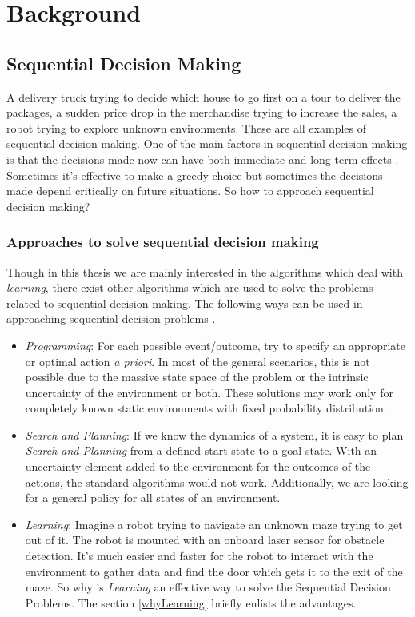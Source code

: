 \documentclass[12pt]{report}
\begin{document}
\chapter{Background} %

\label{background} %

\section{Sequential Decision Making}
\label{sequential_decision_making}
A delivery truck trying to decide which house to go first on a tour to deliver the packages, a sudden price drop in the merchandise trying to increase the sales, a robot trying to explore unknown environments. These are all examples of sequential decision making. One of the main factors in sequential decision making is that the decisions made now can have both immediate and long term effects \cite{littman1996algorithms}. Sometimes it's effective to make a greedy choice but sometimes the decisions made depend critically on future situations. So how to approach sequential decision making?

\subsection{Approaches to solve sequential decision making}
Though in this thesis we are mainly interested in the algorithms which deal with \textit{learning}, there exist other algorithms which are used to solve the problems related to sequential decision making. The following ways can be used in approaching sequential decision problems \cite{wiering2012reinforcement}. 
\begin{itemize}
\item \textit{Programming}: For each possible event/outcome, try to specify an appropriate or optimal action \textit{a priori}. In most of the general scenarios, this is not possible due to the massive state space of the problem or the intrinsic uncertainty of the environment or both. These solutions may work only for completely known static environments with fixed probability distribution. 

\item \textit{Search and Planning}: If we know the dynamics of a system, it is easy to plan \textit{Search and Planning} from a defined start state to a goal state. With an uncertainty element added to the environment for the outcomes of the actions, the standard algorithms would not work. Additionally, we are looking for a general policy for all states of an environment.

\item \textit{Learning}: Imagine a robot trying to navigate an unknown maze trying to get out of it. The robot is mounted with an onboard laser sensor for obstacle detection. It's much easier and faster for the robot to interact with the environment to gather data and find the door which gets it to the exit of the maze. So why is \textit{Learning} an effective way to solve the Sequential Decision Problems. The section \ref{whyLearning} briefly enlists the advantages.
\end{itemize}
\end{document}
